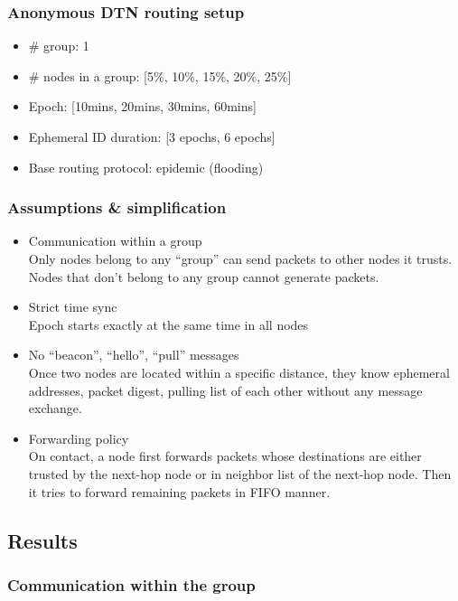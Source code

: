 \documentclass[11pt]{article}
\begin{document}
\subsubsection{Anonymous DTN routing setup}
\begin{itemize}
 \item \# group: 1
 \item \# nodes in a group: [5\%, 10\%, 15\%, 20\%, 25\%]
 \item Epoch: [10mins, 20mins, 30mins, 60mins]
 \item Ephemeral ID duration: [3 epochs, 6 epochs]
 \item Base routing protocol: epidemic (flooding)
\end{itemize}



\subsubsection{Assumptions \& simplification}
\begin{itemize}
 \item Communication within a group\\
Only nodes belong to any ``group'' can send packets to other nodes it trusts. 
Nodes that don't belong to any group cannot generate packets.

 \item Strict time sync\\
Epoch starts exactly at the same time in all nodes

 \item No ``beacon'', ``hello'', ``pull'' messages\\
Once two nodes are located within a specific distance, they know ephemeral addresses, packet digest, pulling list of each other without any message exchange. 

 \item Forwarding policy\\
On contact, a node first forwards packets whose destinations are either trusted by the next-hop node or in neighbor list of the next-hop node.  Then it tries to forward remaining packets in FIFO manner. 
\end{itemize}


\subsection{Results}

\subsubsection{Communication within the group}
\end{document}
